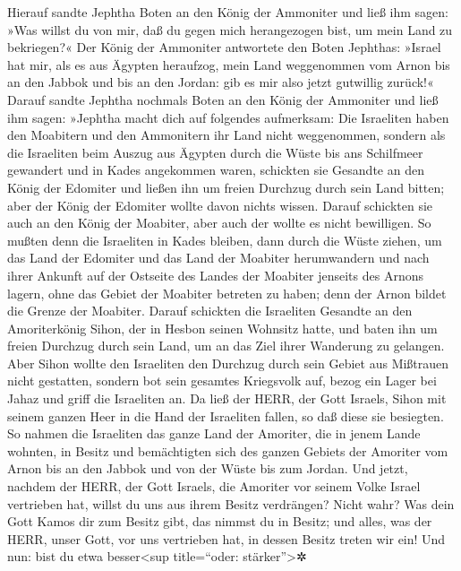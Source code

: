 Hierauf sandte Jephtha Boten an den König der Ammoniter
und ließ ihm sagen: »Was willst du von mir, daß du gegen mich
herangezogen bist, um mein Land zu bekriegen?« Der König
der Ammoniter antwortete den Boten Jephthas: »Israel hat mir, als es aus
Ägypten heraufzog, mein Land weggenommen vom Arnon bis an den Jabbok und
bis an den Jordan: gib es mir also jetzt gutwillig zurück!«
Darauf sandte Jephtha nochmals Boten an den König der
Ammoniter und ließ ihm sagen: »Jephtha macht dich auf
folgendes aufmerksam: Die Israeliten haben den Moabitern und den
Ammonitern ihr Land nicht weggenommen, sondern als die
Israeliten beim Auszug aus Ägypten durch die Wüste bis ans Schilfmeer
gewandert und in Kades angekommen waren, schickten sie
Gesandte an den König der Edomiter und ließen ihn um freien Durchzug
durch sein Land bitten; aber der König der Edomiter wollte davon nichts
wissen. Darauf schickten sie auch an den König der Moabiter, aber auch
der wollte es nicht bewilligen. So mußten denn die Israeliten in Kades
bleiben, dann durch die Wüste ziehen, um das Land der
Edomiter und das Land der Moabiter herumwandern und nach ihrer Ankunft
auf der Ostseite des Landes der Moabiter jenseits des Arnons lagern,
ohne das Gebiet der Moabiter betreten zu haben; denn der Arnon bildet
die Grenze der Moabiter. Darauf schickten die Israeliten
Gesandte an den Amoriterkönig Sihon, der in Hesbon seinen Wohnsitz
hatte, und baten ihn um freien Durchzug durch sein Land, um an das Ziel
ihrer Wanderung zu gelangen. Aber Sihon wollte den
Israeliten den Durchzug durch sein Gebiet aus Mißtrauen nicht gestatten,
sondern bot sein gesamtes Kriegsvolk auf, bezog ein Lager bei Jahaz und
griff die Israeliten an. Da ließ der HERR, der Gott
Israels, Sihon mit seinem ganzen Heer in die Hand der Israeliten fallen,
so daß diese sie besiegten. So nahmen die Israeliten das ganze Land der
Amoriter, die in jenem Lande wohnten, in Besitz und
bemächtigten sich des ganzen Gebiets der Amoriter vom Arnon bis an den
Jabbok und von der Wüste bis zum Jordan. Und jetzt,
nachdem der HERR, der Gott Israels, die Amoriter vor seinem Volke Israel
vertrieben hat, willst du uns aus ihrem Besitz verdrängen?
Nicht wahr? Was dein Gott Kamos dir zum Besitz gibt, das
nimmst du in Besitz; und alles, was der HERR, unser Gott, vor uns
vertrieben hat, in dessen Besitz treten wir ein! Und nun:
bist du etwa besser\textless sup title=``oder: stärker''\textgreater✲
